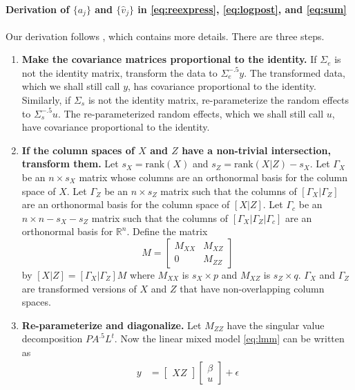 \documentclass{report}
\begin{document}
\paragraph{Derivation of $\{a_j\}$ and $\{\hat v_j\}$ in \eqref{eq:reexpress}, \eqref{eq:logpost}, and \eqref{eq:sum}}  Our derivation follows \cite{hodges:2013},
which contains more details.  There are three steps.
\begin{enumerate}
  \item \textbf{Make the covariance matrices proportional to the identity.}  If $\Sigma_e$ is not the identity matrix,
    transform the data to $\Sigma_e^{-.5}y$.  The transformed data, which we shall still call $y$, has covariance
    proportional to the identity.  Similarly, if $\Sigma_s$ is not the identity matrix, re-parameterize the random
    effects to $\Sigma_s^{-.5}u$.  The re-parameterized random effects, which we shall still call $u$, have
    covariance proportional to the identity.
  \item \textbf{If the column spaces of $X$ and $Z$ have a non-trivial intersection, transform them.}
    Let $s_X=\text{rank}(X)$  and $s_Z=\text{rank}(X|Z) - s_X$.  Let $\Gamma_X$ be an $n \times s_X$ matrix whose
    columns are an orthonormal basis for the column space of $X$.  Let $\Gamma_Z$ be an $n \times s_Z$ matrix
    such that the columns of $\left[\Gamma_X | \Gamma_Z \right]$ are an orthonormal basis for the column space
    of $\left[X|Z\right]$.  Let $\Gamma_c$ be an $n \times n-s_X-s_Z$ matrix such that the columns of
    $\left[\Gamma_X | \Gamma_Z | \Gamma_c\right]$ are an orthonormal basis for $\mathbb{R}^n$.  Define the matrix
    \begin{equation*}
      M = \begin{bmatrix}
               M_{XX} & M_{XZ}\\
               0 & M_{ZZ}
             \end{bmatrix}
    \end{equation*}
    by $[X|Z] = [\Gamma_X|\Gamma_Z]M$ where $M_{XX}$ is $s_X \times p$ and $M_{XZ}$ is $s_Z \times q$.
    $\Gamma_X$ and $\Gamma_Z$ are transformed versions of $X$ and $Z$ that have non-overlapping
    column spaces.
  \item \textbf{Re-parameterize and diagonalize.}  Let $M_{ZZ}$ have the singular value decomposition
    $PA^{.5}L^t$.  Now the linear mixed model \eqref{eq:lmm} can be written as
    \begin{equation*}
      \begin{split}
        y &= \begin{bmatrix} X Z \end{bmatrix} \begin{bmatrix} \beta \\ u \end{bmatrix} + \epsilon\\

\end{split}
\end{equation*}
\end{enumerate}
\end{document}
